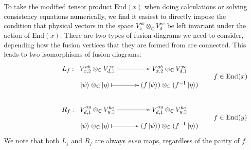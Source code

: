 \documentclass[12pt,a4paper]{article}
\newcommand{\tp}{\otimes}
\newcommand{\End}{\text{End}}
\newcommand{\cl}{\mathbb{C}\ell}
\newcommand{\ket}[1]{\ensuremath{\left|#1\right\rangle}}
\begin{document}
To take the modified tensor product $\End(x)$ when doing calculations or solving consistency equations numerically, we find it easiest to directly impose the condition that physical vectors in the space $V^{ab}_x \tp_{\mathbb{C}} V^{xc}_d$ be left invariant under the action of $\text{End}(x)$. 
There are two types of fusion diagrams we need to consider, depending how the fusion vertices that they are formed from are connected. This leads to two isomorphisms of fusion diagrams:
\begin{align}
&\vcenter{\xymatrix @!0 @M=1mm @C=42mm{
 &L_f: \; \;V^{ab}_{x,2} \tp_{\mathbb{C}} V^{xc}_{d,1} \ar[r]            & V^{ab}_{x,2} \tp_{\mathbb{C}} V^{xc}_{d,1}  \\
		  &\;\;\;\;\;\;\; \ket{\psi}\tp_\mathbb{C} \ket{\eta}  \ar@{|->}[r] & (f\ket{\psi}) \tp_{\mathbb{C}} (f^{-1} \ket{\eta})  
		  }} \quad \quad f \in \text{End}(x)\\
		  \\		  
&		  \vcenter{\xymatrix @!0 @M=1mm @C=42mm{
		  &R_f: \; \;V^{ay}_{d,1} \tp_{\mathbb{C}} V^{bc}_{y,2} \ar[r]            & V^{ay}_{d,1} \tp_{\mathbb{C}} V^{bc}_{y,2} \\
		  &\;\;\;\;\;\;\; \ket{\psi}\tp_\mathbb{C} \ket{\eta}  \ar@{|->}[r] & (f\ket{\psi}) \tp_{\mathbb{C}} (f^{-1} \ket{\eta})
	}}	\quad \quad f \in \text{End}(y)
	\end{align}
We note that both $L_f$ and $R_f$ are always {\it even} maps, regardless of the parity of $f$. 

\end{document}
